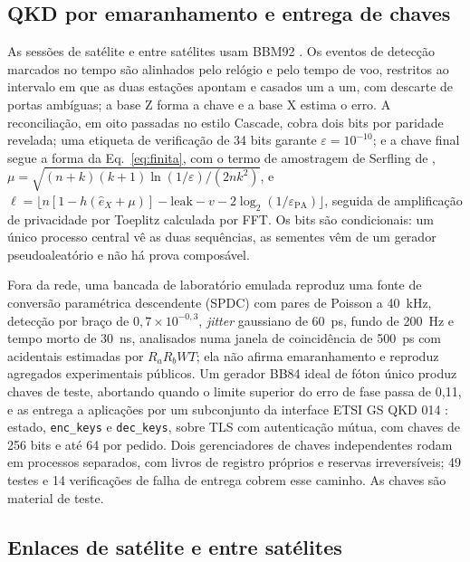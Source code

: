 \documentclass[12pt]{article}
\providecommand{\citeasnoun}[1]{\cite{#1}}
\begin{document}
\subsection{QKD por emaranhamento e entrega de chaves}
\label{sec:tec_bbm92}

As sessões de satélite e entre satélites usam BBM92 \cite{bennett1992}. Os
eventos de detecção marcados no tempo são alinhados pelo relógio e pelo tempo de
voo, restritos ao intervalo em que as duas estações apontam e casados um a um,
com descarte de portas ambíguas; a base Z forma a chave e a base X estima o erro.
A reconciliação, em oito passadas no estilo Cascade, cobra dois bits por
paridade revelada; uma etiqueta de verificação de 34 bits garante
$\varepsilon=10^{-10}$; e a chave final segue a forma da Eq.~\ref{eq:finita}, com o
termo de amostragem de Serfling de \citeasnoun{tomamichel2017},
$\mu=\sqrt{(n+k)(k+1)\ln(1/\varepsilon)/(2nk^2)}$, e
$\ell=\lfloor n[1-h(\hat e_X+\mu)]-\mathrm{leak}-v-2\log_2(1/\varepsilon_{\mathrm{PA}})\rfloor$,
seguida de amplificação de privacidade por Toeplitz calculada por FFT. Os bits
são condicionais: um único processo central vê as duas sequências, as sementes
vêm de um gerador pseudoaleatório e não há prova composável.

Fora da rede, uma bancada de laboratório emulada reproduz uma fonte de
conversão paramétrica descendente (SPDC) com pares de Poisson a 40~kHz, detecção
por braço de $0{,}7\times10^{-0{,}3}$, \textit{jitter} gaussiano de 60~ps, fundo de
200~Hz e tempo morto de 30~ns, analisados numa janela de coincidência de 500~ps
com acidentais estimadas por $R_aR_bW T$; ela não afirma emaranhamento e
reproduz agregados experimentais públicos. Um gerador BB84 ideal de fóton único
produz chaves de teste, abortando quando o limite superior do erro de fase passa
de 0,11, e as entrega a aplicações por um subconjunto da interface ETSI GS QKD
014 \cite{etsi014}: estado, \texttt{enc\_keys} e \texttt{dec\_keys}, sobre TLS
com autenticação mútua, com chaves de 256 bits e até 64 por pedido. Dois
gerenciadores de chaves independentes rodam em processos separados, com livros
de registro próprios e reservas irreversíveis; 49 testes e 14 verificações de
falha de entrega cobrem esse caminho. As chaves são material de teste.

\subsection{Enlaces de satélite e entre satélites}
\label{sec:tec_sat}
\end{document}
